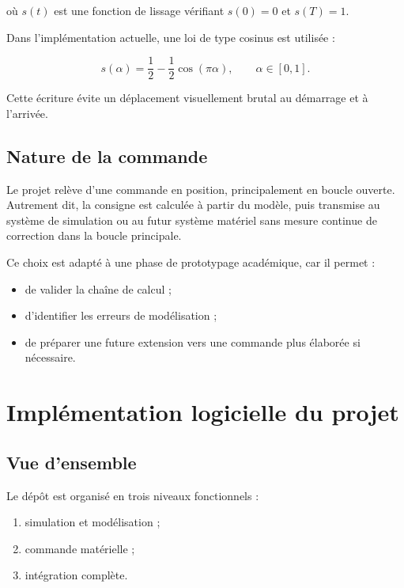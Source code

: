 \documentclass[12pt,a4paper]{report}
\begin{document}
où $s(t)$ est une fonction de lissage vérifiant $s(0)=0$ et $s(T)=1$.

Dans l'implémentation actuelle, une loi de type cosinus est utilisée :

\begin{equation}
    s(\alpha) = \frac{1}{2} - \frac{1}{2}\cos(\pi \alpha),
    \qquad \alpha \in [0,1].
\end{equation}

Cette écriture évite un déplacement visuellement brutal au démarrage et à l'arrivée.

\section{Nature de la commande}

Le projet relève d'une commande en position, principalement en boucle ouverte.
Autrement dit, la consigne est calculée à partir du modèle, puis transmise au système
de simulation ou au futur système matériel sans mesure continue de correction dans la
boucle principale.

Ce choix est adapté à une phase de prototypage académique, car il permet :

\begin{itemize}
    \item de valider la chaîne de calcul ;
    \item d'identifier les erreurs de modélisation ;
    \item de préparer une future extension vers une commande plus élaborée si nécessaire.
\end{itemize}

\chapter{Implémentation logicielle du projet}\label{chap:implementation}

\section{Vue d'ensemble}

Le dépôt est organisé en trois niveaux fonctionnels :

\begin{enumerate}[label=\arabic*.]
    \item simulation et modélisation ;
    \item commande matérielle ;
    \item intégration complète.
\end{enumerate}
\end{document}
